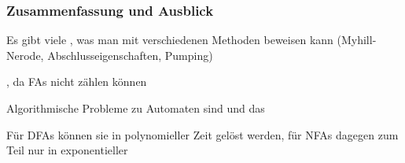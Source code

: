\documentclass[aspectratio=1610,onlymath]{beamer}
\begin{document}
\begin{frame}\frametitle{Zusammenfassung und Ausblick}

Es gibt viele , was man mit verschiedenen Methoden beweisen kann (Myhill-Nerode, Abschlusseigenschaften, Pumping)
\bigskip

, da FAs nicht zählen können
\bigskip

Algorithmische Probleme zu Automaten sind  und das 
\bigskip

Für DFAs können sie in polynomieller Zeit gelöst werden, für NFAs dagegen zum Teil nur in exponentieller


\end{frame}
\end{document}
